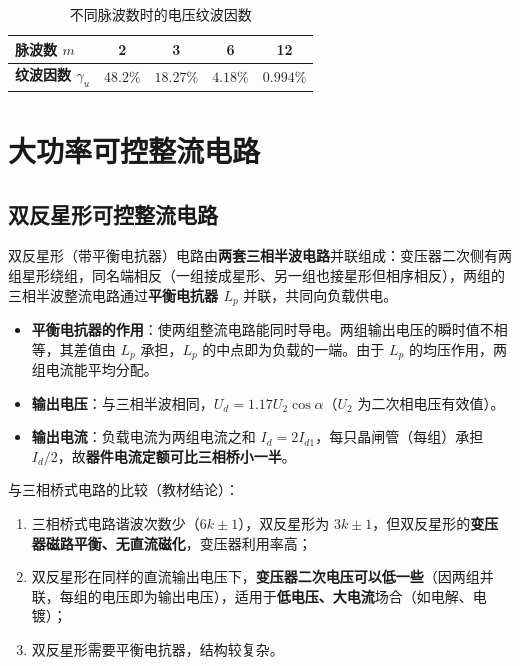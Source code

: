 \begin{table}[htbp]
\centering
\caption{不同脉波数时的电压纹波因数}
\label{tab:3-3}
\begin{tabular}{lcccc}
\toprule
\textbf{脉波数 $m$} & 2 & 3 & 6 & 12 \\
\midrule
\textbf{纹波因数 $\gamma_u$} & $48.2\%$ & $18.27\%$ & $4.18\%$ & $0.994\%$ \\
\bottomrule
\end{tabular}
\end{table}


\section{大功率可控整流电路}

\subsection{双反星形可控整流电路}

双反星形（带平衡电抗器）电路由\textbf{两套三相半波电路}并联组成：变压器二次侧有两组星形绕组，同名端相反（一组接成星形、另一组也接星形但相序相反），两组的三相半波整流电路通过\textbf{平衡电抗器 $L_p$} 并联，共同向负载供电。

\begin{itemize}
  \item \textbf{平衡电抗器的作用}：使两组整流电路能同时导电。两组输出电压的瞬时值不相等，其差值由 $L_p$ 承担，$L_p$ 的中点即为负载的一端。由于 $L_p$ 的均压作用，两组电流能平均分配。
  \item \textbf{输出电压}：与三相半波相同，$U_d=1.17U_2\cos\alpha$（$U_2$ 为二次相电压有效值）。
  \item \textbf{输出电流}：负载电流为两组电流之和 $I_d=2I_{d1}$，每只晶闸管（每组）承担 $I_d/2$，故\textbf{器件电流定额可比三相桥小一半}。
\end{itemize}

与三相桥式电路的比较（教材结论）：

\begin{enumerate}
  \item 三相桥式电路谐波次数少（$6k\pm1$），双反星形为 $3k\pm1$，但双反星形的\textbf{变压器磁路平衡、无直流磁化}，变压器利用率高；
  \item 双反星形在同样的直流输出电压下，\textbf{变压器二次电压可以低一些}（因两组并联，每组的电压即为输出电压），适用于\textbf{低电压、大电流}场合（如电解、电镀）；
  \item 双反星形需要平衡电抗器，结构较复杂。
\end{enumerate}

